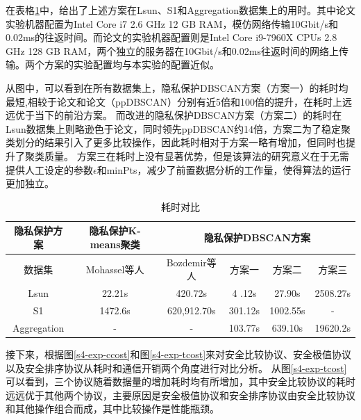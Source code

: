 在表格\ref{s4-table-runtime}中，给出了上述方案在Lsun、S1和Aggregation数据集上的用时。其中论文\cite{mohassel2019practical}实验机器配置为Intel Core i7 2.6 GHz 12 GB RAM，模仿网络传输10Gbit/s和0.02ms的往返时间。而论文\cite{bozdemir2021privacy}的实验机器配置则是Intel Core i9-7960X CPUs 2.8 GHz 128 GB RAM，两个独立的服务器在10Gbit/s和0.02ms往返时间的网络上传输。两个方案的实验配置均与本实验的配置近似。

从图中，可以看到在所有数据集上，隐私保护DBSCAN方案（方案一）的耗时均最短,相较于论文\cite{mohassel2019practical}和论文\cite{bozdemir2021privacy}（ppDBSCAN）分别有近5倍和100倍的提升，在耗时上远远优于当下的前沿方案。
而改进的隐私保护DBSCAN方案（方案二）的耗时在Lsun数据集上则略逊色于论文\cite{mohassel2019practical}，同时领先ppDBSCAN约14倍，方案二为了稳定聚类划分的结果引入了更多比较操作，因此耗时相对于方案一略有增加，但同时也提升了聚类质量。
方案三在耗时上没有显著优势，但是该算法的研究意义在于无需提供人工设定的参数$\epsilon$和minPts，减少了前置数据分析的工作量，使得算法的运行更加独立。

\begin{table}[!htbp]
	\centering
	\renewcommand{\arraystretch}{1.3}
	\caption{耗时对比}
	\label{s4-table-runtime}
	\begin{tabular}{c|c|c|c|c|c}
		\hline
		隐私保护方案 & 隐私保护K-means聚类                      & \multicolumn{4}{c}{隐私保护DBSCAN方案}                                 \\
		\hline
		数据集       & Mohassel等人\cite{mohassel2019practical} & Bozdemir等人\cite{bozdemir2021privacy} & 方案一  & 方案二   & 方案三   \\
		\hline
		Lsun         & 22.21s                                   & 420.72s                                & 4 .12s  & 27.90s   & 2508.27s \\
		\hline
		S1           & 1472.6s                                  & 620,912.70s                            & 301.12s & 1002.55s & -        \\
		\hline
		Aggregation  & -                                        & -                                      & 103.77s & 639.10s  & 19620.2s \\
		\hline
	\end{tabular}
\end{table}

接下来，根据图\ref{s4-exp-ccost}和图\ref{s4-exp-tcost}来对安全比较协议、安全极值协议以及安全排序协议从耗时和通信开销两个角度进行对比分析。
从图\ref{s4-exp-tcost}可以看到，三个协议随着数据量的增加耗时均有所增加，其中安全比较协议的耗时远远优于其他两个协议，主要原因是安全极值协议和安全排序协议由安全比较协议和其他操作组合而成，其中比较操作是性能瓶颈。


